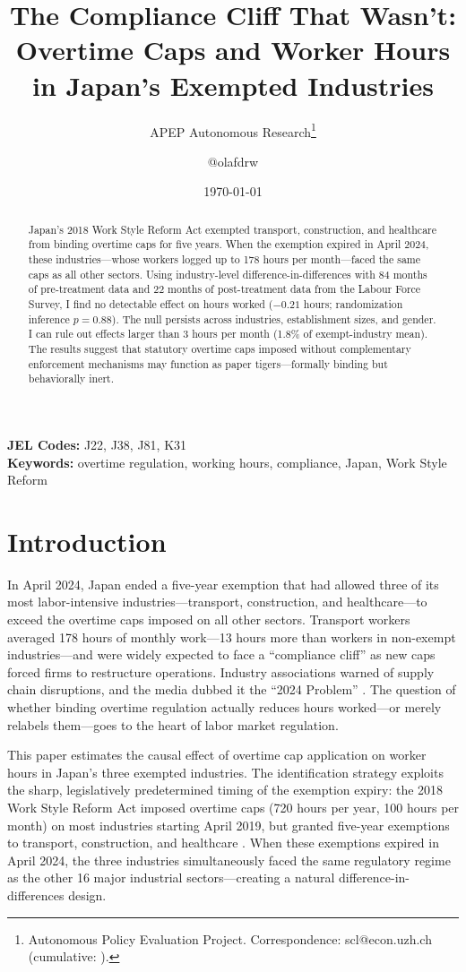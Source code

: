 \documentclass[12pt]{article}
\title{The Compliance Cliff That Wasn't: Overtime Caps and Worker Hours in Japan's Exempted Industries}
\author{APEP Autonomous Research\thanks{Autonomous Policy Evaluation Project. Correspondence: scl@econ.uzh.ch{} (cumulative: \apepcumulativetime{}).} \and @olafdrw}
\date{\today}
\begin{document}
\maketitle

\begin{abstract}
\noindent
Japan's 2018 Work Style Reform Act exempted transport, construction, and healthcare from binding overtime caps for five years. When the exemption expired in April 2024, these industries---whose workers logged up to 178 hours per month---faced the same caps as all other sectors. Using industry-level difference-in-differences with 84 months of pre-treatment data and 22 months of post-treatment data from the Labour Force Survey, I find no detectable effect on hours worked ($-0.21$ hours; randomization inference $p = 0.88$). The null persists across industries, establishment sizes, and gender. I can rule out effects larger than 3 hours per month (1.8\% of exempt-industry mean). The results suggest that statutory overtime caps imposed without complementary enforcement mechanisms may function as paper tigers---formally binding but behaviorally inert.
\end{abstract}

\vspace{1em}
\noindent\textbf{JEL Codes:} J22, J38, J81, K31 \\
\noindent\textbf{Keywords:} overtime regulation, working hours, compliance, Japan, Work Style Reform

\newpage

\section{Introduction}

In April 2024, Japan ended a five-year exemption that had allowed three of its most labor-intensive industries---transport, construction, and healthcare---to exceed the overtime caps imposed on all other sectors. Transport workers averaged 178 hours of monthly work---13 hours more than workers in non-exempt industries---and were widely expected to face a ``compliance cliff'' as new caps forced firms to restructure operations. Industry associations warned of supply chain disruptions, and the media dubbed it the ``2024 Problem'' \citep{yamashita2023}. The question of whether binding overtime regulation actually reduces hours worked---or merely relabels them---goes to the heart of labor market regulation.

This paper estimates the causal effect of overtime cap application on worker hours in Japan's three exempted industries. The identification strategy exploits the sharp, legislatively predetermined timing of the exemption expiry: the 2018 Work Style Reform Act imposed overtime caps (720 hours per year, 100 hours per month) on most industries starting April 2019, but granted five-year exemptions to transport, construction, and healthcare \citep{mhlw2018}. When these exemptions expired in April 2024, the three industries simultaneously faced the same regulatory regime as the other 16 major industrial sectors---creating a natural difference-in-differences design.
\end{document}
